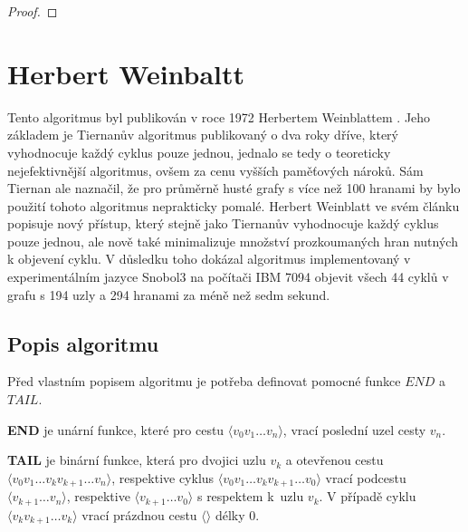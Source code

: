         \begin{proof}
            \lipsum[1]
        \end{proof}

\chapter{Herbert Weinbaltt}
    \label{chapter:Algo2}
    Tento algoritmus byl publikován v roce 1972 Herbertem Weinblattem \cite{A_new_search_algorithm}. Jeho základem je Tiernanův algoritmus \cite{Tiernan} publikovaný o dva roky dříve, který vyhodnocuje každý cyklus pouze jednou, jednalo se tedy o teoreticky nejefektivnější algoritmus, ovšem za cenu vyšších paměťových nároků. Sám Tiernan ale naznačil, že pro průměrně husté grafy s více než 100 hranami by bylo použití tohoto algoritmus neprakticky pomalé. Herbert Weinblatt ve svém článku popisuje nový přístup, který stejně jako Tiernanův vyhodnocuje každý cyklus pouze jednou, ale nově také minimalizuje množství prozkoumaných hran nutných k objevení cyklu. V důsledku toho dokázal algoritmus implementovaný v experimentálním jazyce Snobol3 na počítači IBM 7094 objevit všech 44 cyklů v grafu s 194 uzly a 294 hranami za méně než sedm sekund.

    \section{Popis algoritmu}
        Před vlastním popisem algoritmu je potřeba definovat pomocné funkce $\mathit{END}$ a $\mathit{TAIL}$.

        \begin{definition}
            \label{def:end}
            \textbf{END} je unární funkce, které pro cestu $\langle v_0 v_1 \dots v_n \rangle$, vrací poslední uzel cesty $v_n$.
        \end{definition}

        \begin{definition}
            \textbf{TAIL} je binární funkce, která pro dvojici uzlu $v_k$ a otevřenou cestu $\langle v_0 v_1 \dots v_k v_{k+1} \dots v_n \rangle$, respektive cyklus $\langle v_0 v_1 \dots v_k v_{k+1} \dots v_0 \rangle$ vrací podcestu $\langle v_{k+1} \dots v_n \rangle$, respektive $\langle v_{k+1} \dots v_0 \rangle$ s respektem k~uzlu $v_k$. V případě cyklu $\langle v_k v_{k+1} \dots v_k \rangle$ vrací prázdnou cestu $\langle \rangle$ délky 0.
        \end{definition}

